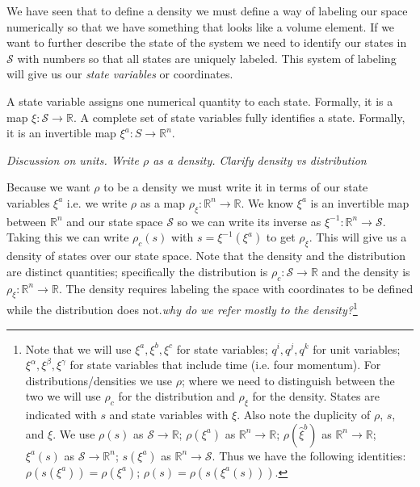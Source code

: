 \documentclass{article}
\begin{document}
	
	We have seen that to define a density we must define a way of labeling our space numerically so that we have something that looks like a volume element. If we want to further describe the state of the system we need to identify our states in $\mathcal{S}$ with numbers so that all states are uniquely labeled. This system of labeling will give us our \textit{state variables} or coordinates. 

\begin{defn}
	A state variable assigns one numerical quantity to each state. Formally, it is a map $\xi : \mathcal{S} \to \mathbb{R}$. A complete set of state variables fully identifies a state. Formally, it is an invertible  map $\xi^a : S \rightarrow \mathbb{R}^n $.
\end{defn}

\emph{Discussion on units. Write $\rho$ as a density. Clarify density vs distribution} 
	
	Because we want $\rho$ to be a density we must write it in terms of our state variables $\xi^a$ i.e. we write $\rho$ as a map $\rho_\xi: \mathbb{R}^n \to \mathbb{R}$. We know $\xi^a$ is an invertible map between $\mathbb{R}^n$ and our state space $\mathcal{S}$ so we can write its inverse as $\xi^{-1} : \mathbb{R}^n \to \mathcal{S}$. Taking this we can write $\rho_c(s)$ with $s = \xi^{-1}(\xi^a)$ to get $\rho_\xi$. This will give us a density of states over our state space. Note that the density and the distribution are distinct quantities; specifically the distribution is $\rho_c : \mathcal{S} \to \mathbb{R}$ and the density is $\rho_{\xi} : \mathbb{R}^n \to \mathbb{R}$. The density requires labeling the space with coordinates to be defined while the distribution does not.\emph{why do we refer mostly to the density?}\footnote{Note that we will use $\xi^a, \xi^b, \xi^c$ for state variables; $q^i, q^j, q^k$ for unit variables; $\xi^\alpha, \xi^\beta, \xi^\gamma$ for state variables that include time (i.e. four momentum). For distributions/densities we use $\rho$; where we need to distinguish between the two we will use $\rho_c$ for the distribution and $\rho_\xi$ for the density. States are indicated with $s$ and state variables with $\xi$. Also note the duplicity of $\rho$, $s$, and $\xi$. We use $\rho(s)$ as $\mathcal{S} \to \mathbb{R}$; $\rho(\xi^a)$ as $\mathbb{R}^n \to \mathbb{R}$; $\rho(\hat{\xi}^b)$ as $\mathbb{R}^n \to \mathbb{R}$; $\xi^a(s)$ as $\mathcal{S} \to \mathbb{R}^n$; $s(\xi^a)$ as $\mathbb{R}^n \to \mathcal{S}$.
Thus we have the following identities: $\rho(s(\xi^a)) = \rho(\xi^a)$; $\rho(s) = \rho(s (\xi^a(s)))$.}
\end{document}
